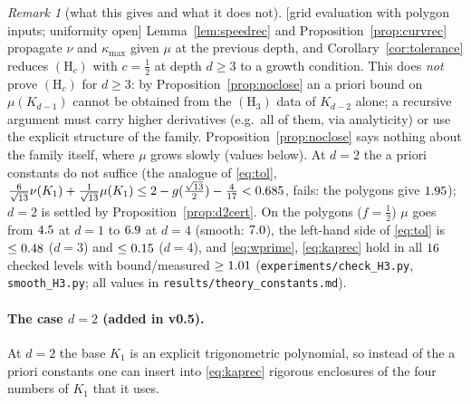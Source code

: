 \documentclass[10pt,a4paper]{article}
\theoremstyle{plain}
\theoremstyle{definition}
\theoremstyle{remark}
\newtheorem{remark}[theorem]{Remark}
\newcommand{\status}[1]{\textsf{\small [#1]}}
\begin{document}
\begin{remark}[what this gives and what it does not]\label{rem:H3status}\status{grid evaluation with polygon inputs; uniformity open}
Lemma~\ref{lem:speedrec} and Proposition~\ref{prop:curvrec} propagate $\nu$ and $\kappa_{\max}$ given $\mu$ at the previous depth, and Corollary~\ref{cor:tolerance} reduces $(\mathrm H_c)$ with $c=\frac12$ at depth $d\ge3$ to a growth condition. This does \emph{not} prove $(\mathrm H_c)$ for $d\ge3$: by Proposition~\ref{prop:noclose} an a priori bound on $\mu(K_{d-1})$ cannot be obtained from the $(\mathrm H_3)$ data of $K_{d-2}$ alone; a recursive argument must carry higher derivatives (e.g.\ all of them, via analyticity) or use the explicit structure of the family. Proposition~\ref{prop:noclose} says nothing about the family itself, where $\mu$ grows slowly (values below). At $d=2$ the a priori constants do not suffice (the analogue of \eqref{eq:tol}, $\frac6{\sqrt{13}}\nu(K_1)+\frac1{\sqrt{13}}\mu(K_1)\le2-g(\frac{\sqrt{13}}2)-\frac4{17}<0.685$, fails: the polygons give $1.95$); $d=2$ is settled by Proposition~\ref{prop:d2cert}. On the polygons ($f=\frac12$) $\mu$ goes from $4.5$ at $d=1$ to $6.9$ at $d=4$ (smooth: $7.0$), the left-hand side of \eqref{eq:tol} is $\le0.48$ ($d=3$) and $\le0.15$ ($d=4$), and \eqref{eq:wprime}, \eqref{eq:kaprec} hold in all $16$ checked levels with bound/measured $\ge1.01$ (\texttt{experiments/check\_H3.py}, \texttt{smooth\_H3.py}; all values in \texttt{results/theory\_constants.md}).
\end{remark}

\paragraph{The case $d=2$ (added in v0.5).} At $d=2$ the base $K_1$ is an explicit trigonometric polynomial, so instead of the a priori constants one can insert into \eqref{eq:kaprec} rigorous enclosures of the four numbers of $K_1$ that it uses.
\end{document}
